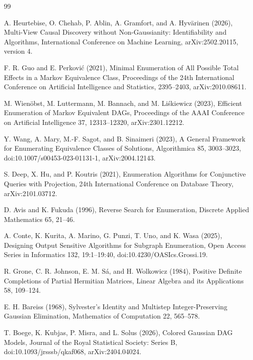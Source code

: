 \documentclass{article}
\begin{document}
\begin{thebibliography}{99}

   A. Heurtebise, O. Chehab, P. Ablin, A. Gramfort, and A. Hyv\"arinen (2026), Multi-View Causal Discovery without Non-Gaussianity: Identifiability and Algorithms, International Conference on Machine Learning, arXiv:2502.20115, version 4.

   F. R. Guo and E. Perkovi\'c (2021), Minimal Enumeration of All Possible Total Effects in a Markov Equivalence Class, Proceedings of the 24th International Conference on Artificial Intelligence and Statistics, 2395--2403, arXiv:2010.08611.

   M. Wien\"obst, M. Luttermann, M. Bannach, and M. Li\'skiewicz (2023), Efficient Enumeration of Markov Equivalent DAGs, Proceedings of the AAAI Conference on Artificial Intelligence 37, 12313--12320, arXiv:2301.12212.

   Y. Wang, A. Mary, M.-F. Sagot, and B. Sinaimeri (2023), A General Framework for Enumerating Equivalence Classes of Solutions, Algorithmica 85, 3003--3023, doi:10.1007/s00453-023-01131-1, arXiv:2004.12143.

   S. Deep, X. Hu, and P. Koutris (2021), Enumeration Algorithms for Conjunctive Queries with Projection, 24th International Conference on Database Theory, arXiv:2101.03712.

   D. Avis and K. Fukuda (1996), Reverse Search for Enumeration, Discrete Applied Mathematics 65, 21--46.

   A. Conte, K. Kurita, A. Marino, G. Punzi, T. Uno, and K. Wasa (2025), Designing Output Sensitive Algorithms for Subgraph Enumeration, Open Access Series in Informatics 132, 19:1--19:40, doi:10.4230/OASIcs.Grossi.19.

   R. Grone, C. R. Johnson, E. M. S\'a, and H. Wolkowicz (1984), Positive Definite Completions of Partial Hermitian Matrices, Linear Algebra and its Applications 58, 109--124.

   E. H. Bareiss (1968), Sylvester's Identity and Multistep Integer-Preserving Gaussian Elimination, Mathematics of Computation 22, 565--578.

   T. Boege, K. Kubjas, P. Misra, and L. Solus (2026), Colored Gaussian DAG Models, Journal of the Royal Statistical Society: Series B, doi:10.1093/jrsssb/qkaf068, arXiv:2404.04024.


\end{thebibliography}
\end{document}
